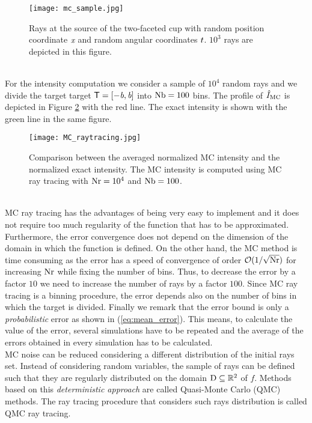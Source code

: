 \begin{figure}[h]
\begin{center}
    \texttt{[image: mc\_sample.jpg]}
    \caption{Rays at the source of the two-faceted cup with random position coordinate $\textit{x}$ and random angular coordinates $t$. $10^3$ rays are depicted in this figure.}
    \label{fig:mc_sample1}
\end{center}
  \end{figure}
\\ \indent For the intensity computation we consider a sample of $10^4$ random rays and we divide the target target $\textsf{T} = [-\textit{b}, \textit{b}]$ into $\textrm{Nb}= 100$ bins.
The profile of $\hat{I}_{\textrm{MC}}$ is depicted in Figure \ref{fig:mc_intensity} with the red line. The exact intensity is shown with the green line in the same figure.
\begin{figure}[t]
\begin{center}
    \texttt{[image: MC\_raytracing.jpg]}
    \caption{Comparison between the averaged normalized MC intensity and the normalized exact intensity. The MC intensity is computed using MC ray tracing with $\textrm{Nr} = 10^4$ and $\textrm{Nb} = 100$.}
   \label{fig:mc_intensity}
\end{center}
\end{figure}
\\ \indent MC ray tracing has the advantages of being very easy to implement and it does not require too much regularity of the function that has to be approximated. Furthermore, the error convergence does not depend on the dimension of the domain in which the function is defined.
On the other hand, the MC method is time consuming as the error has a speed of convergence of order $\mathcal{O}(1/\sqrt{\textrm{Nr}})$ for increasing $\textrm{Nr}$ while fixing the number of bins. 
Thus, to decrease the error by a factor $10$ we need to increase the number of rays by a factor $100$.
Since MC ray tracing is a binning procedure, the error depends also on the number of bins in which the target is divided. Finally we remark that the error bound is only a \emph{probabilistic} error as shown in (\ref{eq:mean_error}). This means, to calculate the value of the error, several simulations have to be repeated and the average of the errors obtained in every simulation has to be calculated. \\ \indent 
MC noise can be reduced considering a different distribution of the initial rays set.
Instead of considering random variables, the sample of rays can be defined such that they are regularly distributed on the domain $\textup{D}\subseteq\mathbb{R}^2$ of $f$. Methods based on this \textit{deterministic approach} are called Quasi-Monte Carlo (QMC) methods. The ray tracing procedure that considers such rays distribution is called QMC ray tracing.
